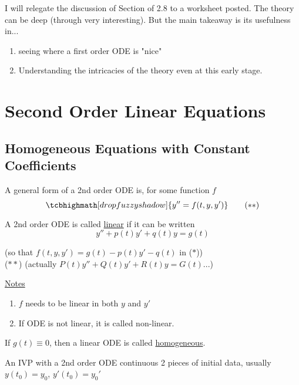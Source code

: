 I will relegate the discussion of Section of 2.8 to a worksheet posted. The theory can be deep (through very interesting). But the main takeaway is its usefulness in...
\begin{enumerate}[label=\protect\circled{\Roman*}]
	\item seeing where a first order ODE is "nice"
	\item Understanding the intricacies of the theory even at this early stage.
\end{enumerate}
\redhline
\section*{Second Order Linear Equations}
\subsection*{Homogeneous Equations with Constant Coefficients}
A general form of a 2nd order ODE is, for some function $f$
\begin{equation*}
	\tcbhighmath[drop fuzzy shadow]{y'' = f(t, y, y')} \tag{$\ast \ast$}
\end{equation*}
\begin{definition-N}
	A 2nd order ODE is called \underline{linear} if it can be written
	\begin{equation*}
		y'' + p(t)y' + q(t)y = g(t)
	\end{equation*}
	\begin{center}
		(so that $f(t, y, y') = g(t) - p(t)y' - q(t)$ in ($\ast$))\\
		($\ast \ast$) (actually $P(t)y'' + Q(t)y' + R(t)y = G(t)$...)
	\end{center}
	\underline{Notes}
	\begin{enumerate}[label=\protect\circled{\Roman*}]
		\item $f$ needs to be linear in both $y$ and $y'$
		\item If ODE is not linear, it is called non-linear.
	\end{enumerate}
\end{definition-N}
\begin{definition-N}
	If $g(t) \equiv 0$, then a linear ODE is called \underline{homogeneous}.
\end{definition-N}
\begin{definition-N}
	An IVP with a 2nd order ODE continuous 2 pieces of initial data, usually $y(t_0) = y_0$, $y'(t_0) = y_0'$
\end{definition-N}
